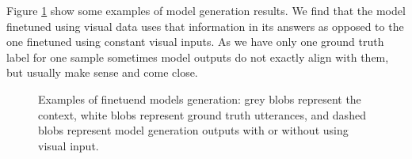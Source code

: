 Figure \ref{fig:examples} show some examples of model generation results. We find that the model finetuned using visual data uses that information in its answers as opposed to the one finetuned using constant visual inputs. As we have only one ground truth label for one sample sometimes model outputs do not exactly align with them, but usually make sense and come close.

\begin{figure}
    \centering
    \caption{Examples of finetuend models generation: grey blobs represent the context, white blobs represent ground truth utterances, and dashed blobs represent model generation outputs with or without using visual input.}
    \label{fig:examples}
\end{figure}



\begin{table}
\caption{Test split metrics for both finetuned models and BlenderBot 400M.}
\label{table:test_metrics}
\centering
\tabcolsep=0.11cm
\end{table}

\begin{table}[pt]
\caption{Metrics on test split by source for both finetuned models and BlenderBot 400M. We report metrics for top-3 most frequent sources.}
\label{table:test_metrics_by_source}
\centering
{}
\end{table}